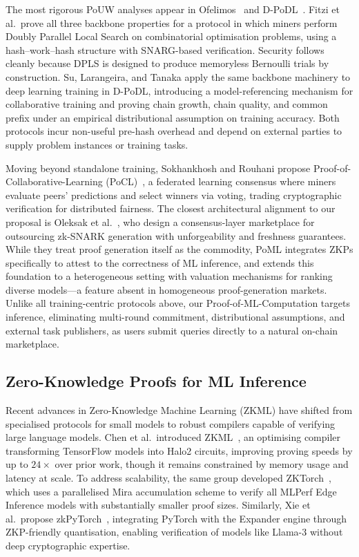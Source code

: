 The most rigorous PoUW analyses appear in Ofelimos~\cite{FKPR22} and D-PoDL~\cite{SLT23}. Fitzi et al.\ prove all three backbone properties for a protocol in which miners perform Doubly Parallel Local Search on combinatorial optimisation problems, using a hash--work--hash structure with SNARG-based verification. Security follows cleanly because DPLS is designed to produce memoryless Bernoulli trials by construction. Su, Larangeira, and Tanaka apply the same backbone machinery to deep learning training in D-PoDL, introducing a model-referencing mechanism for collaborative training and proving chain growth, chain quality, and common prefix under an empirical distributional assumption on training accuracy. Both protocols incur non-useful pre-hash overhead and depend on external parties to supply problem instances or training tasks.

Moving beyond standalone training, Sokhankhosh and Rouhani propose Proof-of-Collaborative-Learning (PoCL)~\cite{pocl}, a federated learning consensus where miners evaluate peers' predictions and select winners via voting, trading cryptographic verification for distributed fairness. The closest architectural alignment to our proposal is Oleksak et al.~\cite{zksnarkmarket}, who design a consensus-layer marketplace for outsourcing zk-SNARK generation with unforgeability and freshness guarantees. While they treat proof generation itself as the commodity, PoML integrates ZKPs specifically to attest to the correctness of ML inference, and extends this foundation to a heterogeneous setting with valuation mechanisms for ranking diverse models---a feature absent in homogeneous proof-generation markets. Unlike all training-centric protocols above, our Proof-of-ML-Computation targets inference, eliminating multi-round commitment, distributional assumptions, and external task publishers, as users submit queries directly to a natural on-chain marketplace.

\subsection{Zero-Knowledge Proofs for ML Inference}

Recent advances in Zero-Knowledge Machine Learning (ZKML) have shifted from specialised protocols for small models to robust compilers capable of verifying large language models. Chen et al.\ introduced ZKML~\cite{chen2024zkml}, an optimising compiler transforming TensorFlow models into Halo2 circuits, improving proving speeds by up to $24\times$ over prior work, though it remains constrained by memory usage and latency at scale. To address scalability, the same group developed ZKTorch~\cite{chen2025zktorch}, which uses a parallelised Mira accumulation scheme to verify all MLPerf Edge Inference models with substantially smaller proof sizes. Similarly, Xie et al.\ propose zkPyTorch~\cite{xie2025zkpytorch}, integrating PyTorch with the Expander engine through ZKP-friendly quantisation, enabling verification of models like Llama-3 without deep cryptographic expertise.


